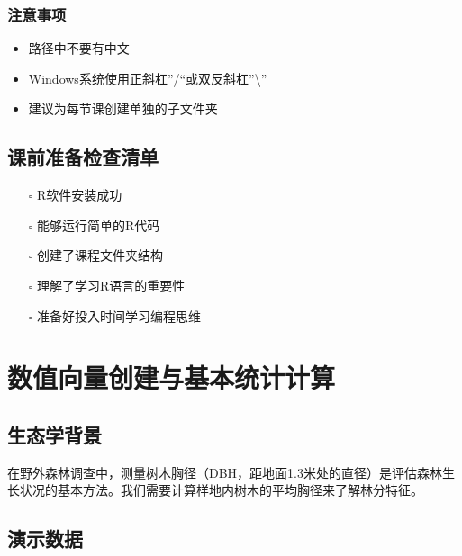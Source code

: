 \documentclass[
  twoside]{book}
\providecommand{\tightlist}{%
  \setlength{\itemsep}{0pt}\setlength{\parskip}{0pt}}
\begin{document}
\hypertarget{ux6ce8ux610fux4e8bux9879}{%
\subsubsection{注意事项}\label{ux6ce8ux610fux4e8bux9879}}

\begin{itemize}
\tightlist
\item
  路径中不要有中文
\item
  Windows系统使用正斜杠''/``或双反斜杠''\textbackslash''
\item
  建议为每节课创建单独的子文件夹
\end{itemize}

\hypertarget{ux8bfeux524dux51c6ux5907ux68c0ux67e5ux6e05ux5355}{%
\subsection{课前准备检查清单}\label{ux8bfeux524dux51c6ux5907ux68c0ux67e5ux6e05ux5355}}

\begin{itemize}
\tightlist
\item[$\square$]
  R软件安装成功
\item[$\square$]
  能够运行简单的R代码
\item[$\square$]
  创建了课程文件夹结构
\item[$\square$]
  理解了学习R语言的重要性
\item[$\square$]
  准备好投入时间学习编程思维
\end{itemize}

\hypertarget{ux6570ux503cux5411ux91cfux521bux5efaux4e0eux57faux672cux7edfux8ba1ux8ba1ux7b97}{%
\section{数值向量创建与基本统计计算}\label{ux6570ux503cux5411ux91cfux521bux5efaux4e0eux57faux672cux7edfux8ba1ux8ba1ux7b97}}

\hypertarget{ux751fux6001ux5b66ux80ccux666f}{%
\subsection{生态学背景}\label{ux751fux6001ux5b66ux80ccux666f}}

在野外森林调查中，测量树木胸径（DBH，距地面1.3米处的直径）是评估森林生长状况的基本方法。我们需要计算样地内树木的平均胸径来了解林分特征。

\hypertarget{ux6f14ux793aux6570ux636e}{%
\subsection{演示数据}\label{ux6f14ux793aux6570ux636e}}
\end{document}
